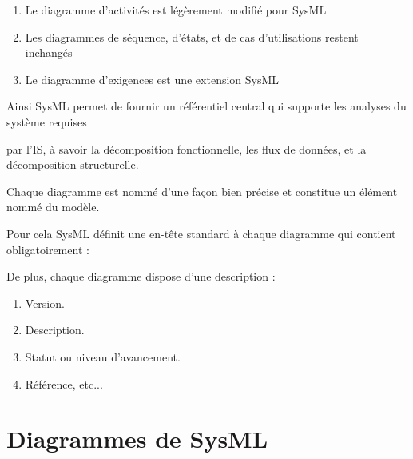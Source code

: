\documentclass[12pt,a4paper]{report}
\begin{document}
\begin{enumerate}
	\item  Le diagramme d'activit\'{e}s est l\'{e}g\`{e}rement modifi\'{e} pour SysML
	
	\item  Les diagrammes de s\'{e}quence, d'\'{e}tats, et de cas d'utilisations restent inchang\'{e}s
	
	\item  Le diagramme d'exigences est une extension SysML
\end{enumerate}

\noindent \begin{flushleft}
	
	
	\noindent 
	
	\noindent Ainsi SysML permet de fournir un r\'{e}f\'{e}rentiel central qui supporte les analyses du syst\`{e}me requises
	
	\noindent par l'IS, \`{a} savoir la d\'{e}composition fonctionnelle, les flux de donn\'{e}es, et la d\'{e}composition structurelle. 
	
	\noindent Chaque diagramme est nomm\'{e} d'une fa\c{c}on bien pr\'{e}cise et constitue un \'{e}l\'{e}ment nomm\'{e} du mod\`{e}le. 
	
	\noindent Pour cela SysML d\'{e}finit une en-t\^{e}te standard \`{a} chaque diagramme qui contient obligatoirement : 
	
	\noindent 
	
	\noindent De plus, chaque diagramme dispose d'une description :
\end{flushleft}

\begin{enumerate}
	\item  Version.
	
	\item  Description.
	
	\item  Statut ou niveau d'avancement.
	
	\item  R\'{e}f\'{e}rence, etc...
\end{enumerate}

\noindent \begin{flushleft}
	
\end{flushleft}


\section{ Diagrammes de SysML}
\end{document}
